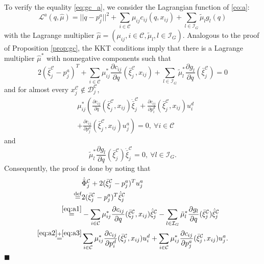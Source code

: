 \documentclass[journal]{IEEEtran}
\newenvironment{Proof}{\noindent{\em Proof:\/}}{\hfill $\blacksquare$\par}
\newcommand{\D}{\mathcal{D}}
\newcommand{\I}{\mathcal{I}}
\newcommand{\C}{\mathcal{C}}
\newcommand{\1}{\mathbf{1}}
\renewcommand{\L}{\mathcal{L}}
\begin{document}
\begin{Proof}
To verify the equality \eqref{eq:gc_a}, we consider the Lagrangian function of \eqref{co:a}:
\begin{equation*}
	\L^a(q,\hat{\mu})=||q-p^a_j||^2+\sum_{i\in \C}\mu_{ij}c_{ij}(q,x_{ij})+\sum_{l\in\I_G}\tilde{\mu}_{l}g_l(q)
\end{equation*}
with the Lagrange multiplier $\hat{\mu}=(\mu_{ij},i\in \C,\tilde{\mu}_l,l\in\I_G)$. 
Analogous to the proof of Proposition \ref{prop:gc}, the KKT conditions imply that there is a Lagrange multiplier $\hat{\mu}^*$ with nonnegative components such that 
\begin{equation}\label{eq:a1}
    2(\bar{\xi}^\C_j-p^a_j)^T+\sum_{i\in \C}\mu_{ij}^*\frac{\partial c_{ij}}{\partial q}(\bar{\xi}^\C_j,x_{ij})
	+\sum_{l\in \I_G}\tilde{\mu}_l^*\frac{\partial g_l}{\partial q}(\bar{\xi}^\C_j)=0
\end{equation}
and for almost every $x^\C_j\notin \D^\C_j$,
\begin{equation}\label{eq:a2}
    \begin{split}
        &\mu_{ij}^*\left(\frac{\partial c_{ij}}{\partial q}(\bar{\xi}^\C_j,x_{ij})\dot{\bar{\xi}}^\C_j+\frac{\partial c_{ij}}{\partial p^d_i}(\bar{\xi}^\C_j,x_{ij})u^d_i\right.\\
        &\left.+\frac{\partial c_{ij}}{\partial p^a_j}(\bar{\xi}^\C_j,x_{ij})u^a_j\right)=0,~\forall i\in \C
    \end{split}
\end{equation}
and
\begin{equation}\label{eq:a3}
	\tilde{\mu}_l^*\frac{\partial g_l}{\partial q}(\bar{\xi}^\C_j)\dot{\bar{\xi}}^\C_j=0,~\forall l\in \I_G.
\end{equation}
Consequently, the proof is done by noting that
\begin{equation*}
	\begin{split}
		&\dot{\bar{\Phi}}^\C_j+2(\bar{\xi}^\C_j-p^a_j)^Tu^a_j\\
		\overset{\mathrm{def}}{=}&2(\bar{\xi}^\C_j-p^a_j)^T\dot{\bar{\xi}}^\C_j\\
		\overset{\eqref{eq:a1}}{=}&-\sum_{i\in \C}\mu_{ij}^*\frac{\partial c_{ij}}{\partial q}(\bar{\xi}^\C_j,x_{ij})\dot{\bar{\xi}}^\C_j-\sum_{l\in \I_G}\tilde{\mu}_l^*\frac{\partial g_l}{\partial q}(\bar{\xi}^\C_j)\dot{\bar{\xi}}^\C_j\\
		\overset{\eqref{eq:a2}+\eqref{eq:a3}}{=}&\sum_{i\in \C}\mu_{ij}^*\frac{\partial c_{ij}}{\partial p^d_i}(\bar{\xi}^\C_j,x_{ij}) u^d_i+\sum_{i\in \C}\mu_{ij}^*\frac{\partial c_{ij}}{\partial p^a_j}(\bar{\xi}^\C_j,x_{ij})u^a_j.
	\end{split}
\end{equation*}
\end{Proof}
\end{document}

